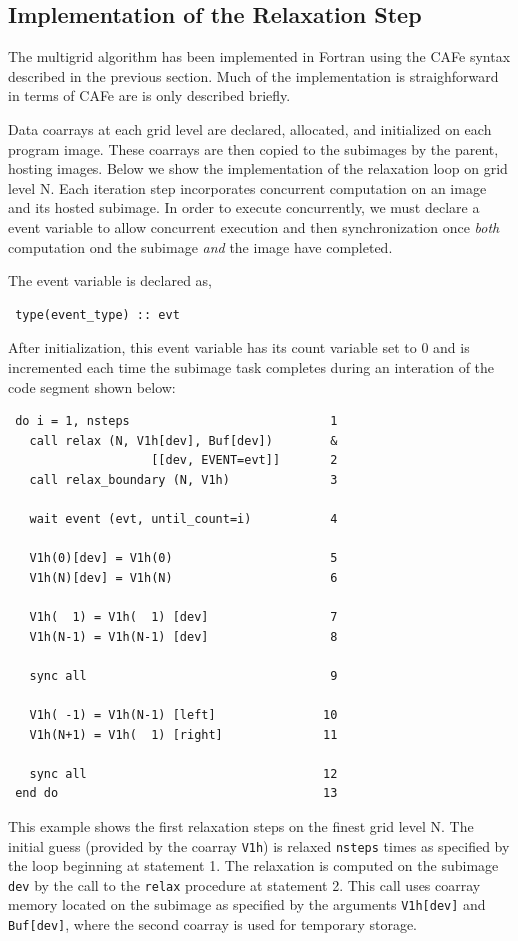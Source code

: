 \subsection{Implementation of the Relaxation Step}

The multigrid algorithm has been implemented in Fortran using the CAFe syntax described in
the previous section.  Much of the implementation is straighforward in terms of CAFe are
is only described briefly.

Data coarrays at each grid level are declared, allocated, and initialized on each program image.
These coarrays are then copied to the subimages by the parent, hosting images.  Below we show
the implementation of the relaxation loop on grid level N.  Each iteration step incorporates
concurrent computation on an image and its hosted subimage.  In order to execute concurrently,
we must declare a event variable to allow concurrent execution and then synchronization once
\emph{both} computation ond the subimage \emph{and} the image have completed.

The event variable is declared as,
\small
\begin{verbatim}
 type(event_type) :: evt
\end{verbatim}
\normalsize
After initialization, this event variable has its count variable set to 0 and is incremented
each time the subimage task completes during an interation of the code segment shown below:
\small
\begin{verbatim}
 do i = 1, nsteps                            1
   call relax (N, V1h[dev], Buf[dev])        &
                    [[dev, EVENT=evt]]       2
   call relax_boundary (N, V1h)              3

   wait event (evt, until_count=i)           4

   V1h(0)[dev] = V1h(0)                      5
   V1h(N)[dev] = V1h(N)                      6

   V1h(  1) = V1h(  1) [dev]                 7
   V1h(N-1) = V1h(N-1) [dev]                 8

   sync all                                  9

   V1h( -1) = V1h(N-1) [left]               10
   V1h(N+1) = V1h(  1) [right]              11

   sync all                                 12
 end do                                     13
\end{verbatim}
\normalsize

This example shows the first relaxation steps on the finest grid level N.  The initial
guess (provided by the coarray \texttt{V1h}) is relaxed \texttt{nsteps} times as
specified by the loop beginning at statement 1.  The relaxation is computed on
the subimage \texttt{dev} by the call to the \texttt{relax} procedure at statement 2.
This call uses coarray memory located on the subimage as specified by the arguments
\texttt{V1h[dev]} and \texttt{Buf[dev]}, where the second coarray is used for temporary
storage.

